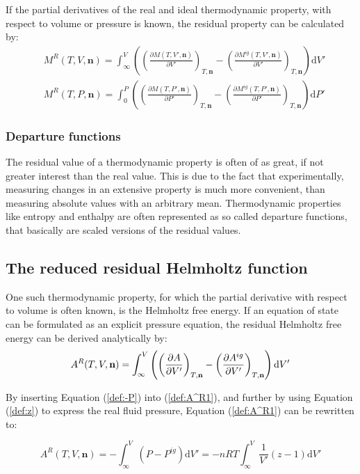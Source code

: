 \documentclass[internal,english]{sintefmemo2012}
\numberwithin{equation}{section}
\newcommand*{\pder}[2]{\left(\frac{\partial #1}{\partial #2}\right)}
\newcommand*{\reff}[1]{(\ref{#1})}
\begin{document}
If the partial derivatives of the real and ideal thermodynamic property, with respect to volume or pressure is known, the residual property can be calculated by:
\begin{align}
\label{def:M^R(T,V,n)}
& M^R(T,V,\textbf{n}) = \int_\infty ^V \left(\pder{M(T,V',\textbf{n})}{V'}_{T,\textbf{n}} - \pder{M^{ig}(T,V',\textbf{n})}{V'}_{T,\textbf{n}} \right) \mathrm{d}V' \\
& M^R(T,P,\textbf{n}) = \int_0 ^P \left(\pder{M(T,P',\textbf{n})}{P'}_{T,\textbf{n}} - \pder{M^{ig}(T,P',\textbf{n})}{P'}_{T,\textbf{n}} \right) \mathrm{d}P'
\label{def:M^R(T,P,n)}
\end{align}

\subsubsection*{Departure functions}
The residual value of a thermodynamic property is often of as great, if not greater interest than the real value. This is due to the fact that experimentally, measuring changes in an extensive property is much more convenient, than measuring absolute values with an arbitrary mean. Thermodynamic properties like entropy and enthalpy are often represented as so called departure functions, that basically are scaled versions of the residual values.
\subsection{The reduced residual Helmholtz function}
One such thermodynamic property, for which the partial derivative with respect to volume is often known, is the Helmholtz free energy. If an equation of state can be formulated as an explicit pressure equation, the residual Helmholtz free energy can be derived analytically by:
\begin{equation}
\label{def:A^R1}
A^R(T,V,\textbf{n}) = \int_\infty ^V \left(\pder{A}{V'}_{T,\textbf{n}} - \pder{A^{ig}}{V'}_{T,\textbf{n}} \right) \mathrm{d}V' \\
\end{equation}

By inserting Equation \reff{def:-P} into \reff{def:A^R1}, and further by using Equation \reff{def:z} to express the real fluid pressure, Equation \reff{def:A^R1} can be rewritten to:

\begin{equation}
\label{def:A^R2}
A^R(T,V,\textbf{n}) = - \int_\infty ^V \left(P - P^{ig} \right) \mathrm{d}V'  = - nRT \int_\infty ^V \frac{1}{V'} (z-1) \mathrm{d}V'
\end{equation}
\end{document}
